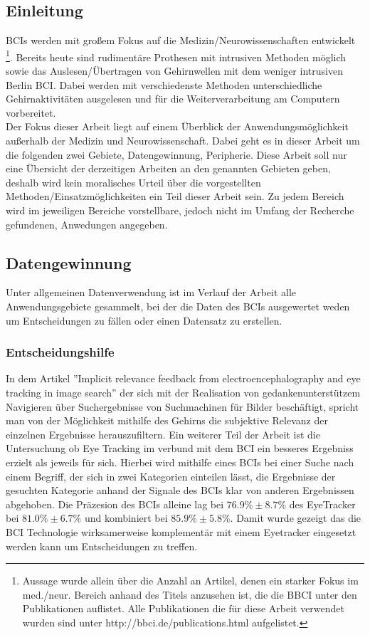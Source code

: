 \documentclass[11pt,ngerman,parskip=half]{scrartcl}
\begin{document}
\subsection{Einleitung}
BCIs werden mit großem Fokus auf die Medizin/Neurowissenschaften entwickelt
\footnote{Aussage wurde allein über die Anzahl an Artikel, denen ein starker
Fokus im med./neur. Bereich anhand des Titels anzusehen ist, die die BBCI
unter den Publikationen auflistet. Alle Publikationen die für diese Arbeit
verwendet wurden sind unter http://bbci.de/publications.html aufgelistet.}.
Bereits heute sind rudimentäre Prothesen mit intrusiven Methoden möglich
sowie das Auslesen/Übertragen von Gehirnwellen mit dem weniger intrusiven
Berlin BCI. Dabei werden mit verschiedenste Methoden unterschiedliche
Gehirnaktivitäten ausgelesen und für die Weiterverarbeitung am Computern
vorbereitet.\\ Der Fokus dieser Arbeit liegt auf einem Überblick der
Anwendungsmöglichkeit außerhalb der Medizin und Neurowissenschaft. Dabei geht
es in dieser Arbeit um die folgenden zwei Gebiete, Datengewinnung,
Peripherie. Diese Arbeit soll nur eine Übersicht der derzeitigen Arbeiten an
den genannten Gebieten geben, deshalb wird kein moralisches Urteil über die
vorgestellten Methoden/Einsatzmöglichkeiten ein Teil dieser Arbeit sein. Zu
jedem Bereich wird im jeweiligen Bereiche vorstellbare, jedoch nicht im
Umfang der Recherche gefundenen, Anwedungen angegeben.

\subsection{Datengewinnung}
Unter allgemeinen Datenverwendung ist im Verlauf der Arbeit alle
Anwendungsgebiete gesammelt, bei der die Daten des BCIs ausgewertet weden um
Entscheidungen zu fällen oder einen Datensatz zu erstellen.

\subsubsection{Entscheidungshilfe}
In dem Artikel ''Implicit relevance feedback from electroencephalography and
eye tracking in image search''\parencite{tracking} der sich mit der
Realisation von gedankenunterstützem Navigieren über Suchergebnisse von
Suchmachinen für Bilder beschäftigt, spricht man von der Möglichkeit mithilfe
des Gehirns die subjektive Relevanz der einzelnen Ergebnisse herauszufiltern.
Ein weiterer Teil der Arbeit ist die Untersuchung ob Eye Tracking im verbund
mit dem BCI ein besseres Ergebniss erzielt als jeweils für sich. Hierbei wird
mithilfe eines BCIs bei einer Suche nach einem Begriff, der sich in zwei
Kategorien einteilen lässt, die Ergebnisse der gesuchten Kategorie anhand der
Signale des BCIs klar von anderen Ergebnissen abgehoben. Die Präzesion des
BCIs alleine lag bei $76.9\% \pm 8.7\% $ des EyeTracker bei $81.0\% \pm 6.7\%
$ und kombiniert bei $85.9\% \pm 5.8\% $\parencite[3.1.]{tracking}. Damit
wurde gezeigt das die BCI Technologie wirksamerweise komplementär mit einem
Eyetracker eingesetzt werden kann um Entscheidungen zu treffen.
\end{document}
